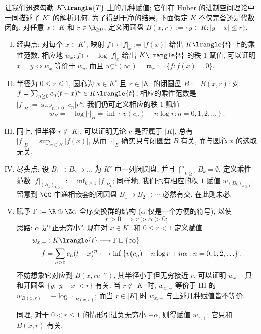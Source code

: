 让我们迅速勾勒 $K\lrangle{T}$ 上的几种赋值; 它们在 Huber 的进制空间理论中一同描述了 $K^\circ$ 的解析几何. 为了得到干净的结果, 下面假定 $K$ 不仅完备还是代数闭的. 对任意 $x \in K$ 和 $r \in \R_{\geq 0}$, 定义闭圆盘 $B(x,r) := \{ y \in K: |y-x| \leq r \}$.

\begin{enumerate}[I.]
	\item 经典点: 对每个 $x \in K^\circ$, 映射 $f \mapsto |f|_x := |f(x)|$ 给出 $K\lrangle{t}$ 上的乘性范数, 相应地 $w_x: f \mapsto -\log|f|_x$ 给出 $K\lrangle{t}$ 的秩 $1$ 赋值, 可以证明 $x=y \iff w_x \;\text{等价于}\; w_y$, 而且 $w_x^{-1}(\infty) = \mathfrak{m}_x := \{f: f(x)=0\}$.
	\item 半径为 $0 \leq r \leq 1$, 圆心为 $x \in K^\circ$ 且 $r \in |K|$ 的闭圆盘 $B := B(x,r)$: 对 $f = \sum_{n \geq 0} c_n (t-x)^n \in K\lrangle{t}$, 相应的乘性范数是 $|f|_B := \sup_{n \geq 0} |c_n| r^n$. 我们仍可定义相应的秩 $1$ 赋值
		\[ w_B = -\log|\cdot|_B = \inf\left\{ v(c_n) - n \log r : n=0,1,2,\ldots \right\}. \]
	\item 同上, 但半径 $r \notin |K|$. 可以证明无论 $r$ 是否属于 $|K|$, 总有 $|f|_B = \sup_{x \in B} |f(x)|$, 从而 $|\cdot|_B$ 确实只与闭圆盘 $B$ 有关, 而与圆心 $x$ 的选取无关. 
	\item 尽头点: 设 $B_1 \supset B_2 \supset \ldots$ 为 $K^\circ$ 中一列闭圆盘, 并且 $\bigcap_{k \geq 1} B_k = \emptyset$, 定义乘性范数 $|f|_{(B_k)_{k \geq 1}} := \inf_{k \geq 1} |f|_{B_k}$; 同样地, 我们也有相应的秩 $1$ 赋值 $w_{(B_k)_{k \geq 1}}$. 留意到 $\CC$ 中递相嵌套的闭圆盘 $B_1 \supset B_2 \supset \cdots$ 必然有交, 在此则未必.
	\item 赋予 $\Gamma := \R \oplus \Z\alpha$ 全序交换群的结构 ($\alpha$ 仅是一个方便的符号), 以使
		\[ r > 0 \implies r > \alpha > 0; \]
		思路: $\alpha$ 是``正无穷小''. 现在对 $x \in K^\circ$ 和 $0 \leq r < 1$ 定义赋值
		\begin{align*}
			w_{x,-}: K\lrangle{t} & \longrightarrow \Gamma \sqcup\{\infty\} \\
			f = \sum_{n \geq 0} c_n (t-x)^n & \longmapsto \inf\left\{ v(c_n) - n \log r + n\alpha : n=0,1,2, \ldots \right\}.
		\end{align*}
		不妨想象它对应到 $B(x, re^{-\alpha})$, 其半径小于但无穷接近 $r$. 可以证明 $w_{x,-}$ 只和开圆盘 $\{y: |y-x| < r\}$ 有关. 当 $r \notin |K|$ 时, $w_{x,-}$ 等价于 III 的 $w_{B(x,r)} = -\log|\cdot|_{B(x,r)}$; 而当 $r \in |K|$ 时 $w_{x,-}$ 与上述几种赋值皆不等价.
		
		同理, 对于 $0 < r \leq 1$ 的情形引进负无穷小 $-\alpha$, 则得赋值 $w_{x,+}$; 它只和 $B(x,r)$ 有关.
\end{enumerate}

